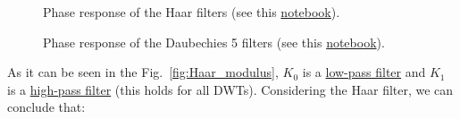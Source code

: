 \begin{figure}
  \centering
  \caption{Phase response of the Haar filters (see this
    \href{https://github.com/Sistemas-Multimedia/Sistemas-Multimedia.github.io/blob/master/study_guide/05-DWT/dwt_filters_analysis.ipynb}{notebook}).}
  \label{fig:haar_phase}
\end{figure}

\begin{figure}
  \centering {}
  \caption{Phase response of the Daubechies 5 filters (see this
    \href{https://github.com/Sistemas-Multimedia/Sistemas-Multimedia.github.io/blob/master/study_guide/05-DWT/dwt_filters_analysis.ipynb}{notebook}).}
  \label{fig:db5_phase}
\end{figure}

As it can be seen in the Fig.~\ref{fig:Haar_modulus}, $K_0$ is a
\href{https://en.wikipedia.org/wiki/Low-pass_filter}{low-pass filter}
and $K_1$ is a
\href{https://en.wikipedia.org/wiki/High-pass_filter}{high-pass
  filter} (this holds for all DWTs). Considering the Haar filter, we
can conclude that:
